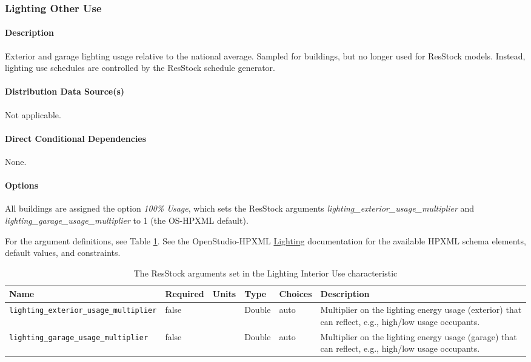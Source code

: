 \subsubsection{Lighting Other Use}\label{lighting_other_use}
\paragraph{Description}
Exterior and garage lighting usage relative to the national average. Sampled for buildings, but no longer used for ResStock models. Instead, lighting use schedules are controlled by the ResStock schedule generator. 

\paragraph{Distribution Data Source(s)}
Not applicable. 

\paragraph{Direct Conditional Dependencies}
None. 

\paragraph{Options}
All buildings are assigned the option \textit{100\% Usage}, which sets the ResStock arguments \textit{lighting\_exterior\_usage\_multiplier} and \textit{lighting\_garage\_usage\_multiplier}  to 1 (the OS-HPXML default).

For the argument definitions, see Table \ref{table:hc_arg_def_light_oth_use}. See the OpenStudio-HPXML \href{https://openstudio-hpxml.readthedocs.io/en/v1.8.1/workflow_inputs.html#hpxml-lighting}{Lighting} documentation for the available HPXML schema elements, default values, and constraints. 

\begin{longtable}[]{ |p{3.5cm}|p{1.5cm}|p{1cm}|p{1.1cm}|p{1.4cm}|p{5.5cm}|} \caption{The ResStock arguments set in the Lighting Interior Use characteristic} \label{table:hc_arg_def_light_oth_use}  \\
\toprule\noalign{}
Name & Required & Units & Type & Choices & Description \\
\midrule\noalign{}
\endhead
\bottomrule\noalign{}
\endlastfoot
\texttt{lighting\_exterior\_usage\_multiplier} & false & & Double & auto
& Multiplier on the lighting energy usage (exterior) that can reflect,
e.g., high/low usage occupants. \\
\hline
\texttt{lighting\_garage\_usage\_multiplier} & false & & Double & auto &
Multiplier on the lighting energy usage (garage) that can reflect, e.g.,
high/low usage occupants. \\
\end{longtable}

